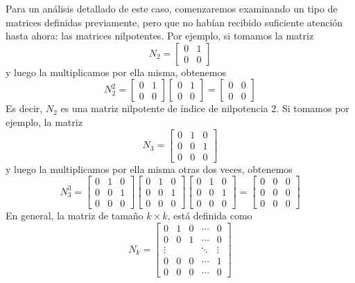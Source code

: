Para un análisis detallado de este caso, comenzaremos examinando un tipo de matrices definidas previamente, pero que no habían recibido suficiente atención hasta ahora: las matrices nilpotentes. Por ejemplo, si tomamos la matriz
$$N_2 = \begin{bmatrix}
    0 & 1 \\
    0 & 0
\end{bmatrix}$$
y luego la multiplicamos por ella misma, obtenemos
$$N_2^2 = \begin{bmatrix}
    0 & 1 \\
    0 & 0
\end{bmatrix}\begin{bmatrix}
    0 & 1 \\
    0 & 0
\end{bmatrix} = \begin{bmatrix}
    0 & 0 \\
    0 & 0
\end{bmatrix}$$
Es decir, $N_2$ es una matriz nilpotente de índice de nilpotencia $2$. Si tomamos por ejemplo, la matriz
$$N_3 = \begin{bmatrix}
    0 & 1 & 0 \\
    0 & 0 & 1 \\
    0 & 0 & 0
\end{bmatrix}$$
y luego la multiplicamos por ella misma otras dos veces, obtenemos
$$N_3^3 = \begin{bmatrix}
    0 & 1 & 0 \\
    0 & 0 & 1 \\
    0 & 0 & 0
\end{bmatrix}\begin{bmatrix}
    0 & 1 & 0 \\
    0 & 0 & 1 \\
    0 & 0 & 0
\end{bmatrix}\begin{bmatrix}
    0 & 1 & 0 \\
    0 & 0 & 1 \\
    0 & 0 & 0
\end{bmatrix} = \begin{bmatrix}
    0 & 0 & 0 \\
    0 & 0 & 0 \\
    0 & 0 & 0
\end{bmatrix}$$\newpage\noindent
En general, la matriz de tamaño $k \times k$, está definida como
\begin{equation}
    N_k = \begin{bmatrix}
        0 & 1 & 0 & \cdots & 0 \\
        0 & 0 & 1 & \cdots & 0 \\
        \vdots & & & \ddots & \vdots \\
        0 & 0 & 0 & \cdots & 1 \\
        0 & 0 & 0 & \cdots & 0
    \end{bmatrix} \label{JAJJAJAJAJAJHQHHQJQUUAUQUWUAUSISIUAJ}
\end{equation}
